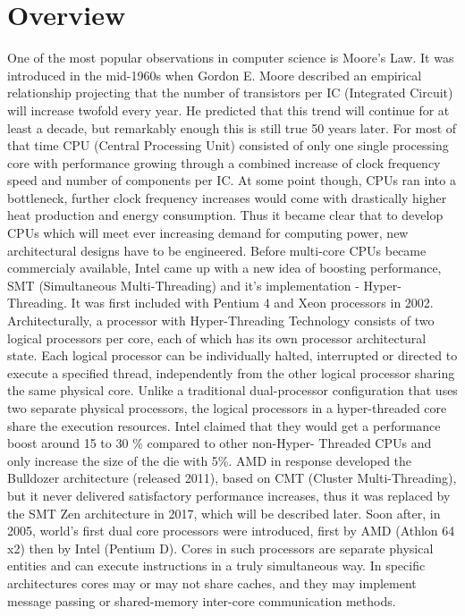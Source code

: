 \chapter{Overview}
One of the most popular observations in computer science is Moore's Law.
It was introduced in the mid-1960s when Gordon E. Moore described an empirical relationship \cite{Moore1965}
projecting that the number of transistors per IC (Integrated Circuit) will increase twofold every year.
He predicted that this trend will continue for at least a decade, but remarkably enough this is still true 50 years later. 
For most of that time CPU (Central Processing Unit) consisted of only one single processing core with performance growing through a combined increase of clock frequency speed and number of components per IC. At some point though, CPUs ran into a bottleneck,
further clock frequency increases would come with drastically higher heat production and energy consumption. \cite{Illinois} Thus it became clear that to develop CPUs which will meet ever increasing demand for computing power, new architectural designs have to be engineered.
\newline
Before multi-core CPUs became commercialy available, Intel came up with a new idea of boosting performance, SMT (Simultaneous Multi-Threading) and it's implementation - Hyper-Threading. It was first included with Pentium 4 and Xeon processors in 2002. Architecturally, a processor with Hyper-Threading Technology consists of two logical processors per core, each of which has its own processor architectural state. Each logical processor can be individually halted, interrupted or directed to execute a specified thread, independently from the other logical processor sharing the same physical core.
Unlike a traditional dual-processor configuration that uses two separate physical processors, the logical processors in a hyper-threaded core share the execution resources. Intel claimed that they would get a performance boost around 15 to 30 \% \cite{intel} compared to other non-Hyper-
Threaded CPUs and only increase the size of the die with 5\%. AMD in response developed the Bulldozer architecture (released 2011), based on CMT (Cluster Multi-Threading), but it never delivered satisfactory performance increases, thus it was replaced by the SMT Zen architecture in 2017, which will be described later.
\newline
Soon after, in 2005, world's first dual core processors were introduced, first by AMD (Athlon 64 x2) then by Intel (Pentium D). Cores in such processors are separate physical entities and can execute instructions in a truly simultaneous way. In specific architectures cores may or may not share caches, and they may implement message passing or shared-memory inter-core communication methods. 
